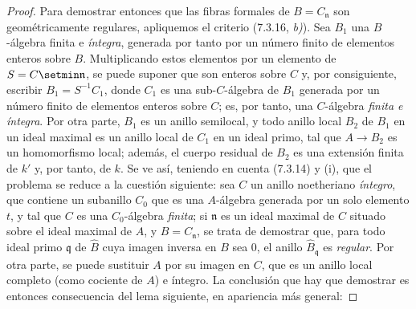 \begin{proof}
Para demostrar entonces que las fibras formales de $B=C_{\mathfrak n}$
son geométricamente regulares, apliquemos el criterio (7.3.16, \emph{b)}). Sea
$B_1$ una $B$-álgebra finita e \emph{íntegra}, generada por tanto por un
número finito de elementos enteros sobre $B$. Multiplicando estos
elementos por un elemento de $S=C\setmin\mathfrak n$, se puede suponer que son
enteros sobre $C$ y, por consiguiente, escribir $B_1=S^{-1}C_1$, donde
$C_1$ es una sub-$C$-álgebra de $B_1$ generada por un número finito de
elementos enteros sobre $C$; es, por tanto, una $C$-álgebra
\emph{finita e íntegra}. Por otra parte, $B_1$ es un anillo semilocal, y
todo anillo local $B_2$ de $B_1$ en un ideal maximal es un anillo local
de $C_1$ en un ideal primo, tal que $A\to B_2$ es un homomorfismo local;
además, el cuerpo residual de $B_2$ es una extensión finita de $k'$ y,
por tanto, de $k$. Se ve así, teniendo en cuenta (7.3.14) y (i), que
el problema se reduce a la cuestión siguiente: sea $C$ un anillo noetheriano
\emph{íntegro}, que contiene un subanillo $C_0$ que es una $A$-álgebra
generada por un solo elemento $t$, y tal que $C$ es una $C_0$-álgebra
\emph{finita}; si $\mathfrak n$ es un ideal maximal de $C$
situado sobre el ideal maximal de $A$, y $B=C_{\mathfrak n}$, se trata
de demostrar que, para todo ideal primo $\mathfrak q$ de $\widehat B$
cuya imagen inversa en $B$ sea 0, el anillo
$\widehat B_{\mathfrak q}$ es \emph{regular}. Por otra parte, se puede
sustituir $A$ por su imagen en $C$, que es un anillo local completo
(como cociente de $A$) e íntegro. La conclusión que hay que demostrar
es entonces consecuencia del lema siguiente, en apariencia más general:
\end{proof}

